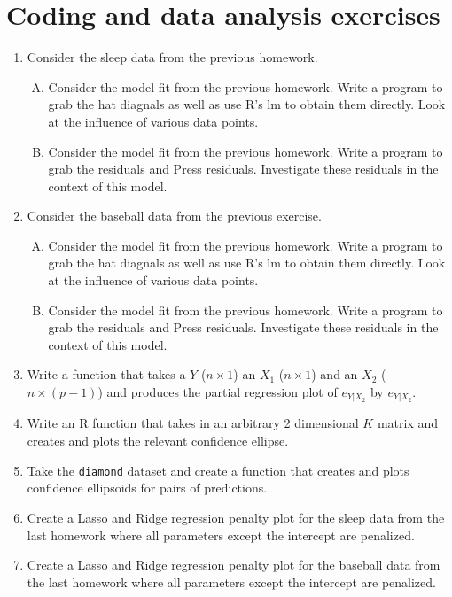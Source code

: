 \documentclass[12pt]{article}
\begin{document}
\section{Coding and data analysis exercises}
\begin{enumerate}
	\item Consider the sleep data from the previous homework.
	\begin{enumerate}[A.]
 		\item Consider the model fit from the previous homework. Write a program to grab the hat diagnals as well as use R's lm to obtain them directly. 
 			Look at the influence of various data points.
		\item Consider the model fit from the previous homework. Write a program to grab the residuals and Press residuals. Investigate these residuals
	   in the context of this model.
   \end{enumerate}
   \item Consider the baseball data from the previous exercise.
	\begin{enumerate}[A.]
		\item Consider the model fit from the previous homework. Write a program to grab the hat diagnals as well as use R's lm to obtain them directly. 
		Look at the influence of various data points.
		\item Consider the model fit from the previous homework. Write a program to grab the residuals and Press residuals. Investigate these residuals
		in the context of this model.
	\end{enumerate}
	\item Write a function that takes a $Y$ ($n\times 1$) an $X_1$ ($n \times 1$) and an $X_2$ ($n \times (p-1)$) and produces the partial regression
		plot of $e_{Y | X_2}$ by $e_{Y | X_2}$.
	 \item Write an R function that takes in an arbitrary 2 dimensional $K$ matrix and creates and plots the relevant confidence ellipse.
	 \item Take the \texttt{diamond} dataset and create a function that creates and plots confidence ellipsoids for pairs of predictions.
	 \item Create a Lasso and Ridge regression penalty plot for the sleep data from the last homework where all parameters except the intercept are penalized.
	 \item Create a Lasso and Ridge regression penalty plot for the baseball data from the last homework where all parameters except the intercept are penalized.
\end{enumerate}
\end{document}
